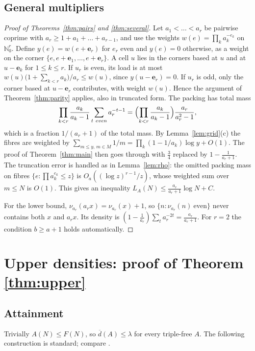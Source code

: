 \documentclass[11pt]{amsart}
\theoremstyle{definition}
\newcommand{\N}{\mathbb{N}}
\newcommand{\dup}{\overline{d}}
\begin{document}
\subsection{General multipliers}
\begin{proof}[Proof of Theorems~\ref{thm:pairs} and \ref{thm:several}]
Let $a_1<\dots<a_r$ be pairwise coprime with $a_r\ge1+a_1+\dots+a_{r-1}$, and use the weights $w(e)=\prod_k a_k^{-e_k}$ on $\N_0^r$. Define $y(e)=w(e+\mathbf e_r)$ for $e_r$ even and $y(e)=0$ otherwise, as a weight on the corner $\{e,e+\mathbf e_1,\dots,e+\mathbf e_r\}$. A cell $u$ lies in the corners based at $u$ and at $u-\mathbf e_k$ for $1\le k\le r$. If $u_r$ is even, its load is at most $w(u)\bigl(1+\sum_{k<r}a_k\bigr)/a_r\le w(u)$, since $y(u-\mathbf e_r)=0$. If $u_r$ is odd, only the corner based at $u-\mathbf e_r$ contributes, with weight $w(u)$. Hence the argument of Theorem~\ref{thm:parity} applies, also in truncated form. The packing has total mass
\[
\prod_{k<r}\frac{a_k}{a_k-1}\sum_{t\ even}a_r^{-t-1}=\Bigl(\prod_{k<r}\frac{a_k}{a_k-1}\Bigr)\frac{a_r}{a_r^2-1},
\]
which is a fraction $1/(a_r+1)$ of the total mass. By Lemma~\ref{lem:grid}(c) the fibres are weighted by $\sum_{m\le y,\,m\in M}1/m=\prod_k(1-1/a_k)\log y+O(1)$. The proof of Theorem~\ref{thm:main} then goes through with $\frac34$ replaced by $1-\frac1{a_r+1}$. The truncation error is handled as in Lemma~\ref{lem:rho}: the omitted packing mass on fibres $\{e: \prod a_k^{e_k}\le z\}$ is $O_{a}((\log z)^{r-1}/z)$, whose weighted sum over $m\le N$ is $O(1)$. This gives an inequality $L_A(N)\le\frac{a_r}{a_r+1}\log N+C$.

For the lower bound, $\nu_{a_r}(a_rx)=\nu_{a_r}(x)+1$, so $\{n:\nu_{a_r}(n)\ \text{even}\}$ never contains both $x$ and $a_rx$. Its density is $(1-\frac1{a_r})\sum_{t}a_r^{-2t}=\frac{a_r}{a_r+1}$. For $r=2$ the condition $b\ge a+1$ holds automatically.
\end{proof}

\section{Upper densities: proof of Theorem \ref{thm:upper}}\label{sec:upper}

\subsection{Attainment}
Trivially $A(N)\le F(N)$, so $\dup(A)\le\lambda$ for every triple-free $A$. The following construction is standard; compare \cite{Coleski}.
\end{document}
